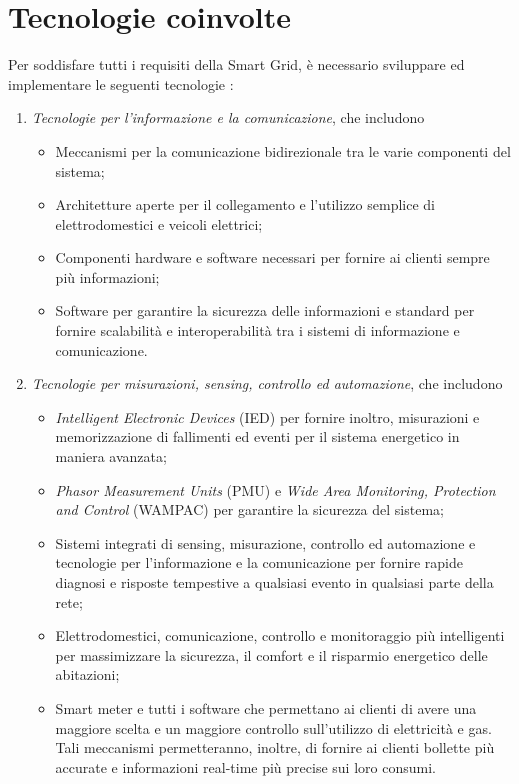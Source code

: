 \section{Tecnologie coinvolte}
Per soddisfare tutti i requisiti della Smart Grid, è necessario sviluppare ed implementare le seguenti tecnologie \cite{smartgrid}:
\begin{enumerate}
\item \textit{Tecnologie per l'informazione e la comunicazione}, che includono
	\begin{itemize}
	\item Meccanismi per la comunicazione bidirezionale tra le varie componenti del sistema;
	\item Architetture aperte per il collegamento e l'utilizzo semplice di elettrodomestici e veicoli elettrici;
	\item Componenti hardware e software necessari per fornire ai clienti sempre più informazioni;
	\item Software per garantire la sicurezza delle informazioni e standard per fornire scalabilità e interoperabilità tra i sistemi di informazione e comunicazione.
	\end{itemize} 
\item \textit{Tecnologie per misurazioni, sensing, controllo ed automazione}, che includono
	\begin{itemize}
	\item \textit{Intelligent Electronic Devices} (IED) per fornire inoltro, misurazioni e memorizzazione di fallimenti ed eventi per il sistema energetico in maniera avanzata;
	\item \textit{Phasor Measurement Units} (PMU) e \textit{Wide Area Monitoring, Protection and Control} (WAMPAC) per garantire la sicurezza del sistema;
	\item Sistemi integrati di sensing, misurazione, controllo ed automazione e tecnologie per l'informazione e la comunicazione per fornire rapide diagnosi e risposte tempestive a qualsiasi evento in qualsiasi parte della rete;
	\item Elettrodomestici, comunicazione, controllo e monitoraggio più intelligenti per massimizzare la sicurezza, il comfort e il risparmio energetico delle abitazioni;
	\item Smart meter e tutti i software che permettano ai clienti di avere una maggiore scelta e un maggiore controllo sull'utilizzo di elettricità e gas. Tali meccanismi permetteranno, inoltre, di fornire ai clienti bollette più accurate e informazioni real-time più precise sui loro consumi.

\end{itemize}
\end{enumerate}
